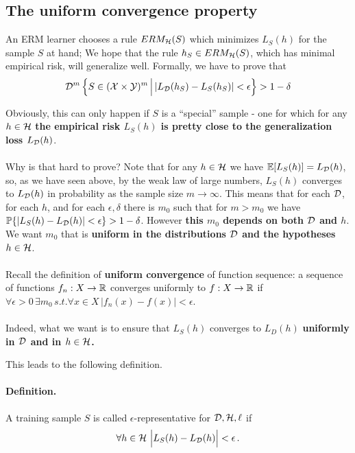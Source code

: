     \subsection{The uniform convergence property}

    An ERM learner chooses a rule $ERM_{\mathcal{H}}(S)$ which minimizes 
$L_S(h)$ for the sample $S$ at hand; 
We hope that the rule $h_S\in ERM_{\mathcal{H}}(S)$, which has minimal empirical risk,
will generalize well.
Formally, we have to prove that 
  \[
    \mathcal{D}^m\left\{ S\in(\mathcal{X}\times\mathcal{Y})^m\,\Big|\, |L_{\mathcal{D}}(h_S)-L_S(h_S)|<\epsilon
    \right\}>1-\delta
  \]

  Obviously, this can only happen if $S$ is a ``special'' sample - one for which
for any $h\in\mathcal{H}$ {\bf the empirical risk $L_S(h)$ is pretty close to the
generalization loss $L_{\mathcal{D}}(h)$}. 
\\~\\
Why is that hard to prove? Note that for any $h\in\mathcal{H}$ we have
$\mathbb{E}[L_S(h)]=L_{\mathcal{D}}(h)$, so, as we have seen above, by the weak law of large numbers, $L_S(h)$
converges to $L_{\mathcal{D}}(h)$ in probability as the sample size $m\to\infty$.
This means that  
for each $\mathcal{D}$, for each $h$,
and for each $\epsilon,\delta$ there is $m_0$ such that for $m>m_0$ we have
$\mathbb{P}\{|L_S(h)-L_{\mathcal{D}}(h)|<\epsilon\}>1-\delta$. However {\bf this $m_0$ depends on
both $\mathcal{D}$ and $h$}. We want $m_0$ that is {\bf uniform in the distributions
  $\mathcal{D}$ and 
the hypotheses $h\in\mathcal{H}$}. 
\\~\\
Recall the definition of {\bf uniform convergence} of
function sequence: a sequence of functions $f_n:X\to\mathbb{R}$ converges uniformly to
$f:X\to\mathbb{R}$ 
if $\forall\epsilon>0 \, \exists m_0 \, s.t. \forall x\in X\,
|f_n(x)-f(x)|<\epsilon$. 
\\~\\
Indeed, what we want is to ensure that $L_S(h)$ converges to $L_D(h)$ 
{\bf uniformly in $\mathcal{D}$ {\bf and} in
$h\in\mathcal{H}$. }





This leads to the following definition. 





\paragraph{Definition.}
    A training sample $S$ is called $\epsilon$-representative for $\mathcal{D},\mathcal{H},\ell$ if 
    \[
      \forall h\in\mathcal{H} \,\, \Big| L_S(h)-L_{\mathcal{D}}(h) \Big|<\epsilon\,.
    \]

